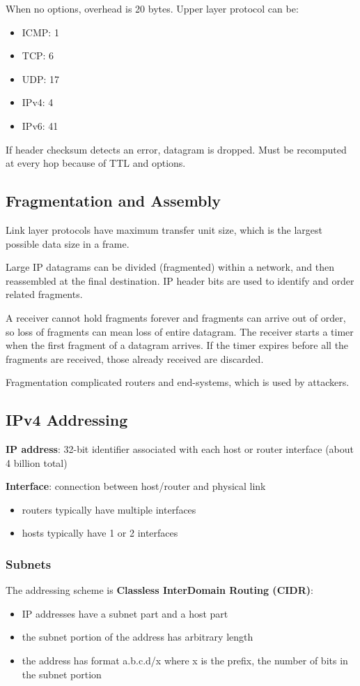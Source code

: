 \documentclass[11pt]{article}
\begin{document}
When no options, overhead is 20 bytes.
Upper layer protocol can be:
\begin{itemize}
\item ICMP: 1
\item TCP: 6
\item UDP: 17
\item IPv4: 4
\item IPv6: 41
\end{itemize}

If header checksum detects an error, datagram is dropped.
Must be recomputed at every hop because of TTL and options.
\subsection{Fragmentation and Assembly}
\label{sec:org2bdbd02}
Link layer protocols have maximum transfer unit size, which is the largest
possible data size in a frame.

Large IP datagrams can be divided (fragmented) within a network, and then
reassembled at the final destination.
IP header bits are used to identify and order related fragments.

A receiver cannot hold fragments forever and fragments can arrive out of order,
so loss of fragments can mean loss of entire datagram.
The receiver starts a timer when the first fragment of a datagram arrives.
If the timer expires before all the fragments are received, those already
received are discarded.

Fragmentation complicated routers and end-systems, which is used by attackers.
\subsection{IPv4 Addressing}
\label{sec:orgef60354}
\textbf{IP address}: 32-bit identifier associated with each host or router interface
(about 4 billion total)

\textbf{Interface}: connection between host/router and physical link
\begin{itemize}
\item routers typically have multiple interfaces
\item hosts typically have 1 or 2 interfaces
\end{itemize}
\subsubsection{Subnets}
\label{sec:orgea5c875}
The addressing scheme is \textbf{Classless InterDomain Routing (CIDR)}:
\begin{itemize}
\item IP addresses have a subnet part and a host part
\item the subnet portion of the address has arbitrary length
\item the address has format a.b.c.d/x where x is the prefix, the number
of bits in the subnet portion
\end{itemize}
\end{document}
